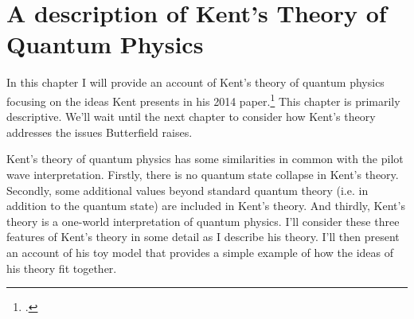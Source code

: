 
\chapter{A description of Kent's Theory of Quantum Physics}
In this chapter I will provide an account of Kent's theory of quantum physics focusing on the ideas Kent presents in his 2014 paper.\footnote{\cite{Kent2014}.} This chapter is primarily descriptive. We'll wait until the next chapter to consider how Kent's theory addresses the issues Butterfield raises.

Kent's theory of quantum physics has some similarities in common with the pilot wave interpretation. Firstly,  there is no quantum state collapse in Kent's theory. Secondly, some additional values beyond standard quantum theory (i.e. in addition to the quantum state) are included in Kent's theory. And thirdly, Kent's theory is a one-world interpretation of quantum physics. I'll consider these three features of Kent's theory in some detail as I describe his theory. I'll then present an account of his toy model that provides a simple example of how the ideas of his theory fit together. 

